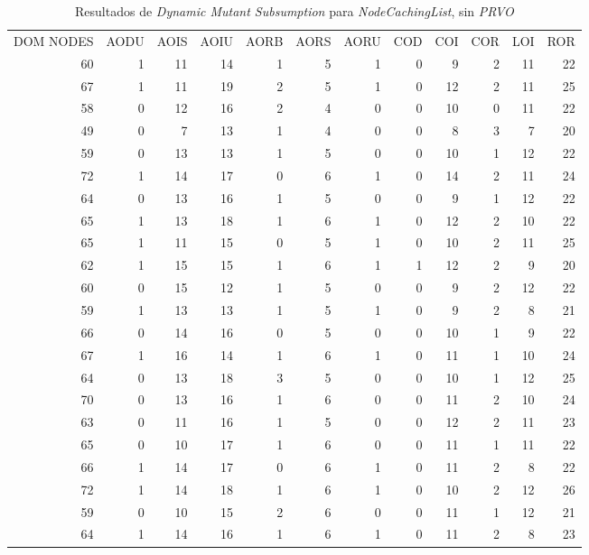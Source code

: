\begin{table}[]
	\caption[\emph{Dynamic Mutant Subsumption} \emph{NodeCachingList}, sin \emph{PRVO}]{Resultados de \emph{Dynamic Mutant Subsumption} para \emph{NodeCachingList}, sin \emph{PRVO}}
	\label{tables.results.subsumption.ncll.noprvo}
	\centering
	\scriptsize
	\def\arraystretch{0.95}
	\setlength\tabcolsep{0.5mm}
	\begin{tabular}{rrrrrrrrrrrr}
		DOM NODES & AODU & AOIS & AOIU & AORB & AORS & AORU & COD & COI & COR & LOI & ROR \\
		60 & 1 & 11 & 14 & 1 & 5 & 1 & 0 & 9 & 2 & 11 & 22 \\
		67 & 1 & 11 & 19 & 2 & 5 & 1 & 0 & 12 & 2 & 11 & 25 \\
		58 & 0 & 12 & 16 & 2 & 4 & 0 & 0 & 10 & 0 & 11 & 22 \\
		49 & 0 & 7 & 13 & 1 & 4 & 0 & 0 & 8 & 3 & 7 & 20 \\
		59 & 0 & 13 & 13 & 1 & 5 & 0 & 0 & 10 & 1 & 12 & 22 \\
		72 & 1 & 14 & 17 & 0 & 6 & 1 & 0 & 14 & 2 & 11 & 24 \\
		64 & 0 & 13 & 16 & 1 & 5 & 0 & 0 & 9 & 1 & 12 & 22 \\
		65 & 1 & 13 & 18 & 1 & 6 & 1 & 0 & 12 & 2 & 10 & 22 \\
		65 & 1 & 11 & 15 & 0 & 5 & 1 & 0 & 10 & 2 & 11 & 25 \\
		62 & 1 & 15 & 15 & 1 & 6 & 1 & 1 & 12 & 2 & 9 & 20 \\
		60 & 0 & 15 & 12 & 1 & 5 & 0 & 0 & 9 & 2 & 12 & 22 \\
		59 & 1 & 13 & 13 & 1 & 5 & 1 & 0 & 9 & 2 & 8 & 21 \\
		66 & 0 & 14 & 16 & 0 & 5 & 0 & 0 & 10 & 1 & 9 & 22 \\
		67 & 1 & 16 & 14 & 1 & 6 & 1 & 0 & 11 & 1 & 10 & 24 \\
		64 & 0 & 13 & 18 & 3 & 5 & 0 & 0 & 10 & 1 & 12 & 25 \\
		70 & 0 & 13 & 16 & 1 & 6 & 0 & 0 & 11 & 2 & 10 & 24 \\
		63 & 0 & 11 & 16 & 1 & 5 & 0 & 0 & 12 & 2 & 11 & 23 \\
		65 & 0 & 10 & 17 & 1 & 6 & 0 & 0 & 11 & 1 & 11 & 22 \\
		66 & 1 & 14 & 17 & 0 & 6 & 1 & 0 & 11 & 2 & 8 & 22 \\
		72 & 1 & 14 & 18 & 1 & 6 & 1 & 0 & 10 & 2 & 12 & 26 \\
		59 & 0 & 10 & 15 & 2 & 6 & 0 & 0 & 11 & 1 & 12 & 21 \\
		64 & 1 & 14 & 16 & 1 & 6 & 1 & 0 & 11 & 2 & 8 & 23 \\

\end{tabular}
\end{table}
